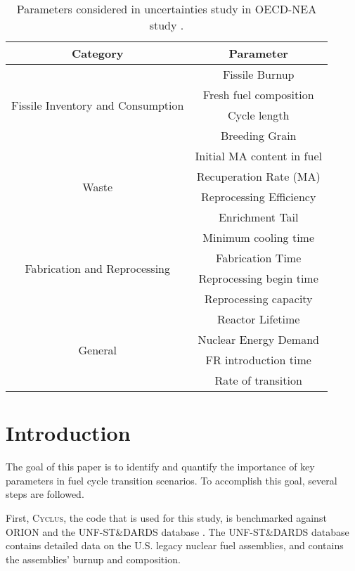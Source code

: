\documentclass{article}
\newcommand{\Cyclus}{\textsc{Cyclus}\xspace}%
\begin{document}
\begin{table}[h]
    \centering
    \caption{Parameters considered in uncertainties study 
             in OECD-NEA study \cite{hyland_effects_2015}.}
    \begin{tabular}{cc}
        \hline
        \textbf{Category} & \textbf{Parameter} \\ \hline
        \multirow{4}{*}{Fissile Inventory and Consumption} & Fissile Burnup \\ 
         & Fresh fuel composition \\ 
         & Cycle length \\ 
         & Breeding Grain\\ \hline
        \multirow{4}{*}{Waste} & Initial \gls{MA} content in fuel \\
         & Recuperation Rate (MA) \\
         & Reprocessing Efficiency \\
         & Enrichment Tail \\ \hline
        \multirow{4}{*}{Fabrication and Reprocessing} & Minimum cooling time \\
        & Fabrication Time\\
        & Reprocessing begin time\\
        & Reprocessing capacity\\ \hline
        \multirow{4}{*}{General} & Reactor Lifetime\\
        & Nuclear Energy Demand \\
        & FR introduction time \\
        & Rate of transition \\ \hline
        
    \end{tabular}
\end{table}




\section{Introduction}

The goal of this paper is to identify and quantify the 
importance of key parameters in fuel cycle transition scenarios.
To accomplish this goal, several steps are followed.

First, \Cyclus, the code that is used for this study, is benchmarked
against ORION \cite{gregg_analysis_2012} and the UNF-ST\&DARDS database
\cite{peterson_used_2013}. The UNF-ST\&DARDS database contains detailed
data on the U.S. legacy nuclear fuel assemblies, and contains the
assemblies' burnup and composition.
\end{document}
